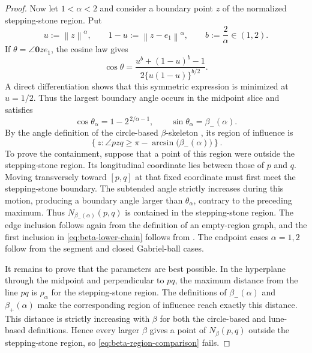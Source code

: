 \documentclass[a4paper,fleqn]{cas-sc}
\theoremstyle{definition}
\theoremstyle{remark}
\newcommand{\norm}[1]{\left\lVert #1\right\rVert}
\newcommand{\set}[1]{\left\{#1\right\}}
\newcommand{\0}{\mathbf{0}}
\begin{document}
\begin{proof}
Now let $1<\alpha<2$ and consider a boundary point $z$ of the normalized
stepping-stone region.  Put
\begin{equation}
    u:=\norm{z}^{\alpha},
    \qquad
    1-u:=\norm{z-e_1}^{\alpha},
    \qquad
    b:=\frac{2}{\alpha}\in(1,2).
\end{equation}
If $\theta=\angle \0 z e_1$, the cosine law gives
\begin{equation}
    \cos\theta
    =
    \frac{u^b+(1-u)^b-1}
         {2\{u(1-u)\}^{b/2}}.
\end{equation}
A direct differentiation shows that this symmetric expression is minimized
at $u=1/2$.  Thus the largest boundary angle occurs in the midpoint slice
and satisfies
\begin{equation}
    \cos\theta_\alpha
    =1-2^{\,2/\alpha-1},
    \qquad
    \sin\theta_\alpha=\beta_-(\alpha).
\end{equation}
By the angle definition of the circle-based $\beta$-skeleton
\citep[Sec.~2]{eppstein2002beta}, its region of influence is
\begin{equation}
    \set{z:\angle pzq\geq
    \pi-\arcsin\bigl(\beta_-(\alpha)\bigr)}.
\end{equation}
To prove the containment, suppose that a point of this region
were outside the stepping-stone region.  Its longitudinal coordinate lies
between those of $p$ and $q$.  Moving transversely toward $[p,q]$ at that
fixed coordinate must first meet the stepping-stone boundary.  The subtended
angle strictly increases during this motion, producing a boundary angle
larger than $\theta_\alpha$, contrary to the preceding maximum.  Thus
$N_{\beta_-(\alpha)}(p,q)$ is contained in the stepping-stone region.
The edge inclusion follows again from the definition of an empty-region
graph, and the first inclusion in \eqref{eq:beta-lower-chain} follows from
.  The endpoint cases $\alpha=1,2$ follow from the
segment and closed Gabriel-ball cases.

It remains to prove that the parameters are best possible.  In the
hyperplane through the midpoint and perpendicular to $pq$, the maximum
distance from the line $pq$ is $\rho_\alpha$ for the stepping-stone region.
The definitions of $\beta_-(\alpha)$ and $\beta_+(\alpha)$ make the
corresponding region of influence reach exactly this distance.  This
distance is strictly increasing with $\beta$ for both the circle-based and
lune-based definitions.  Hence every larger $\beta$ gives a point of
$N_\beta(p,q)$ outside the stepping-stone region, so
\eqref{eq:beta-region-comparison} fails.
\end{proof}
\end{document}
